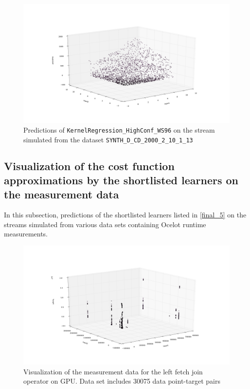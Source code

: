 \begin{figure}[htbp]
  \centering
    \includegraphics[width=\linewidth]{./Figures/kreg_ws96_approximated_func_SYNTH_D_CD_2000_2_10_1_13.pdf}
  \caption{Predictions of \texttt{KernelRegression\_HighConf\_WS96} on the stream simulated from the dataset \texttt{SYNTH\_D\_CD\_2000\_2\_10\_1\_13}}
  \label{fig:kreg_ws96_approximated_func_SYNTH_D_CD_2000_2_10_1_13}
\end{figure}

\clearpage

\subsection{Visualization of the cost function approximations by the shortlisted learners on the measurement data}

In this subsection, predictions of the shortlisted learners listed in \ref{final_5} on the streams simulated from various data sets containing Ocelot runtime measurements.

\begin{figure}[htbp]
  \centering
    \includegraphics[width=\linewidth]{./Figures/ref_ocl_leftfetchjoin_on_gpu}
  \caption{Visualization of the measurement data for the left fetch join operator on GPU. Data set includes 30075 data point-target pairs}
  \label{ref_ocl_leftfetchjoin_on_gpu}
\end{figure}

